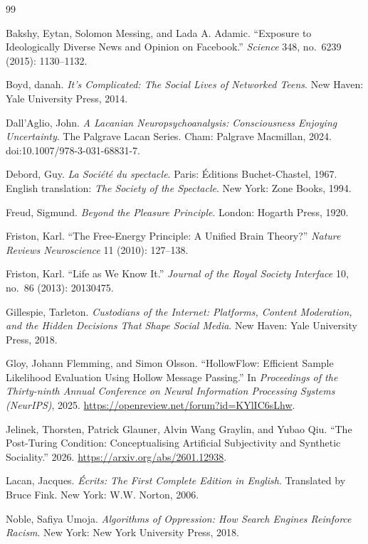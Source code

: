 \documentclass[12pt,a4paper]{book}
\begin{document}
\begin{thebibliography}{99}

 Bakshy, Eytan, Solomon Messing, and Lada A. Adamic. ``Exposure to Ideologically Diverse News and Opinion on Facebook.'' \emph{Science} 348, no.\ 6239 (2015): 1130--1132.

 Boyd, danah. \emph{It's Complicated: The Social Lives of Networked Teens}. New Haven: Yale University Press, 2014.

 Dall'Aglio, John. \emph{A Lacanian Neuropsychoanalysis: Consciousness Enjoying Uncertainty}. The Palgrave Lacan Series. Cham: Palgrave Macmillan, 2024. doi:10.1007/978-3-031-68831-7.

 Debord, Guy. \emph{La Soci\'{e}t\'{e} du spectacle}. Paris: \'{E}ditions Buchet-Chastel, 1967. English translation: \emph{The Society of the Spectacle}. New York: Zone Books, 1994.

 Freud, Sigmund. \emph{Beyond the Pleasure Principle}. London: Hogarth Press, 1920.

 Friston, Karl. ``The Free-Energy Principle: A Unified Brain Theory?'' \emph{Nature Reviews Neuroscience} 11 (2010): 127--138.

 Friston, Karl. ``Life as We Know It.'' \emph{Journal of the Royal Society Interface} 10, no.\ 86 (2013): 20130475.

 Gillespie, Tarleton. \emph{Custodians of the Internet: Platforms, Content Moderation, and the Hidden Decisions That Shape Social Media}. New Haven: Yale University Press, 2018.

 Gloy, Johann Flemming, and Simon Olsson. ``HollowFlow: Efficient Sample Likelihood Evaluation Using Hollow Message Passing.'' In \emph{Proceedings of the Thirty-ninth Annual Conference on Neural Information Processing Systems (NeurIPS)}, 2025. \url{https://openreview.net/forum?id=KYlIC6sLhw}.

 Jelinek, Thorsten, Patrick Glauner, Alvin Wang Graylin, and Yubao Qiu. ``The Post-Turing Condition: Conceptualising Artificial Subjectivity and Synthetic Sociality.'' 2026. \url{https://arxiv.org/abs/2601.12938}.

 Lacan, Jacques. \emph{\'{E}crits: The First Complete Edition in English}. Translated by Bruce Fink. New York: W.W. Norton, 2006.

 Noble, Safiya Umoja. \emph{Algorithms of Oppression: How Search Engines Reinforce Racism}. New York: New York University Press, 2018.


\end{thebibliography}
\end{document}
